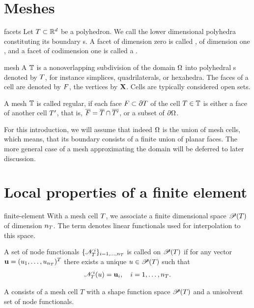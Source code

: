 \section{Meshes}

\begin{Definition}{facets}
  Let $T\subset \mathbb R^d$ be a polyhedron. We call the lower
  dimensional polyhedra constituting its boundary s. A
  facet of dimension zero is called , of dimension one
  , and a facet of codimension one is called a
  .
\end{Definition}

\begin{Definition}{mesh}
  A  $\mathbb T$ is a nonoverlapping subdivision of the
  domain $\Omega$ into polyhedral s denoted by $T$,
  for instance simplices, quadrilaterals, or hexahedra. The
  faces of a cell are denoted by $F$, the
  vertices by $\mathbf X$. Cells are typically considered open sets.

  A mesh $\mathbb T$ is called regular, if each face
  $F \subset \partial T$ of the cell $T\in\mathbb T$ is either a
  face of another cell $T^\prime$, that is,
  $\overline{F} = \overline{T} \cap \overline{T^\prime}$,
  or a subset of $\partial\Omega$.
\end{Definition}

\begin{remark}
  For this introduction, we will assume that indeed $\Omega$ is the
  union of mesh cells, which means, that its boundary consists of a
  finite union of planar faces. The more general case of a mesh
  approximating the domain will be deferred to later discussion.
\end{remark}


\section{Local properties of a finite element}

\begin{Definition}{finite-element}
  With a mesh cell $T$, we associate a finite dimensional
   space $\mathscr P(T)$ of dimension
  $n_T$. The term  denotes linear
  functionals used for interpolation to this space.

  A set of node functionals $\{\mathscr N_T^i\}_{i=1,\dots,n_T}$ is called
   on $\mathscr P(T)$ if for any vector
  $\mathbf u = (u_1,\dots,u_{n_T})^T$ there exists a unique
  $u\in \mathscr P(T)$ such that
  \begin{gather}
    \mathscr N_T^i(u) = \mathbf u_i,\quad i=1,\dots,n_T.
  \end{gather}

  A  consists of a mesh cell $T$ with a shape
  function space $\mathscr P(T)$ and a unisolvent set of node
  functionals.
\end{Definition}

